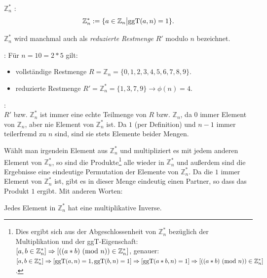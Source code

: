 \begin{refsegment}
\begin{definition}\label{def-zth-znmult}
\textbf{$\mathbb{Z}_n^*$} : 
$$ \mathbb{Z}_n^* := \{ a \in \mathbb{Z}_n \big| {\rm ggT}(a,n) = 1 \}.$$
\end{definition}

$\mathbb{Z}_n^*$ wird manchmal auch als 
{\em reduzierte Restmenge} $R'$ modulo $n$ bezeichnet.

\begin{example}{:}
Für $n = 10=2*5$ gilt: 
\begin{itemize}
  \item[] vollständige Restmenge $R = \mathbb{Z}_n = \{ 0, 1, 2, 3, 4, 5, 6, 7, 8, 9 \}.$
  \item[] reduzierte Restmenge $R' = \mathbb{Z}_n^* = \{ 1, 3, 7, 9 \} \longrightarrow \phi(n)=4$.
\end{itemize}
\end{example}

\begin{remark}{:}\\
$R'$ bzw. $\mathbb{Z}_n^*$ ist immer eine echte Teilmenge von $R$ bzw. $\mathbb{Z}_n$, da $0$ immer
Element von $\mathbb{Z}_n$, aber nie Element von $\mathbb{Z}_n^*$ ist. Da $1$ (per Definition) und $n-1$ immer teilerfremd
zu $n$ sind, sind sie stets Elemente beider Mengen.
\end{remark}

Wählt man irgendein Element aus $\mathbb{Z}_n^*$ und multipliziert es mit jedem
anderen Element von $\mathbb{Z}_n^*$, so sind die Produkte\footnote{%
Dies ergibt sich aus der Abgeschlossenheit von $\mathbb{Z}_n^*$ bezüglich der
Multiplikation und der ggT-Eigenschaft:\\
$[a, b \in \mathbb{Z}_n^* ] \Rightarrow [((a * b) {\rm ~(mod~} n)) \in \mathbb{Z}_n^*]$, genauer:\\
$[a, b \in \mathbb{Z}_n^* ] \Rightarrow  [{\rm ggT}(a, n) = 1, {\rm ggT}(b, n) = 1]
\Rightarrow  [{\rm ggT}(a*b, n) = 1] \Rightarrow  [((a * b) {\rm ~(mod~} n)) \in \mathbb{Z}_n^*]$.
} alle wieder in $\mathbb{Z}_n^*$ und außerdem sind die Ergebnisse eine
eindeutige Permutation der Elemente von $\mathbb{Z}_n^*$. Da die $1$ immer
Element von $\mathbb{Z}_n^*$ ist, gibt es in dieser Menge eindeutig einen
\glqq Partner\grqq, so dass das Produkt $1$ ergibt. Mit anderen Worten:

\begin{satz}\label{thm-zth-znmult}
Jedes Element in $\mathbb{Z}_n^*$ hat eine multiplikative Inverse.
\end{satz}


\end{refsegment}

